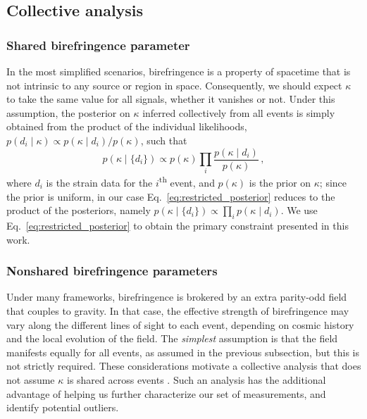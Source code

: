 \documentclass[aps,prd,twocolumn,superscriptaddress,preprintnumbers,nofootinbib]{revtex4-2}
\begin{document}
\subsection{Collective analysis}

\subsubsection{Shared birefringence parameter}

In the most simplified scenarios, birefringence is a property of spacetime that is not intrinsic to any source or region in space. 
Consequently, we should expect $\kappa$ to take the same value for all signals, whether it vanishes or not.
Under this assumption, the posterior on $\kappa$ inferred collectively from all events is simply obtained from the product of the individual likelihoods, $p(d_i \mid\kappa) \propto p(\kappa \mid d_i)/p(\kappa)$, such that
\begin{equation}
    p(\kappa \mid \{d_i\})\propto p(\kappa) \prod_{i}\frac{p(\kappa \mid d_i)}{p(\kappa)}\,,
    \label{eq:restricted_posterior}
\end{equation}
where $d_i$ is the strain data for the $i$\textsuperscript{th} event, and $p(\kappa)$ is the prior on $\kappa$; since the prior is uniform, in our case Eq.~\eqref{eq:restricted_posterior} reduces to the product of the posteriors, namely $p(\kappa \mid \{d_i\}) \propto \prod_{i}p(\kappa \mid d_i)$.
We use Eq.~\eqref{eq:restricted_posterior} to obtain the primary constraint presented in this work.

\subsubsection{Nonshared birefringence parameters}
\label{sec:method:hier}

Under many frameworks, birefringence is brokered by an extra parity-odd field that couples to gravity.
In that case, the effective strength of birefringence may vary along the different lines of sight to each event, depending on cosmic history and the local evolution of the field.
The \emph{simplest} assumption is that the field manifests equally for all events, as assumed in the previous subsection, but this is not strictly required.
These considerations motivate a collective analysis that does not assume $\kappa$ is shared across events \cite{Zimmerman:2019wzo,Isi:2022cii}.
Such an analysis has the additional advantage of helping us further characterize our set of measurements, and identify potential outliers.
\end{document}
